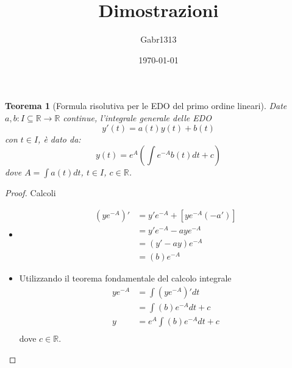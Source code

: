 \documentclass[12pt, a4paper]{article}
\title{Dimostrazioni}
\author{Gabr1313}
\date{\today}
\theoremstyle{break}
\newtheorem{theorem}{Teorema}[section]
\begin{document}
\justify
\sloppy
\maketitle

\newpage
\begin{theorem} [Formula risolutiva per le EDO del primo ordine lineari]
	Date $a, b: I \subseteq \mathbb{R} \rightarrow \mathbb{R}$ continue,
	l'integrale generale delle EDO
	\[
		y'(t) = a(t) y(t) + b(t)
	\]
	con $t \in I $, è dato da:
	\[
		y(t) = e^A \left( \int e^{-A} b(t) dt + c \right)
	\]
	dove $A = \int a(t) dt$, $t \in I$, $c \in \mathbb{R}$.
\end{theorem}
\begin{proof} Calcoli
	\begin{itemize}
		\item
			\begin{align*}
				(y e^{-A})' & = y' e^{-A} + [ye^{-A}(-a')] \\
				            & = y' e^{-A} - aye^{-A}       \\
				            & = (y' - ay)e^{-A}            \\
				            & = (b)e^{-A}
			\end{align*}
		\item Utilizzando il teorema fondamentale del calcolo integrale
			\begin{align*}
				y e^{-A} & = \int (y e^{-A})' dt       \\
				         & = \int (b)e^{-A} dt + c     \\
				y        & = e^A \int (b)e^{-A} dt + c \\
			\end{align*}
			dove $c \in \mathbb{R}$.
	\end{itemize}
\end{proof}
\end{document}
